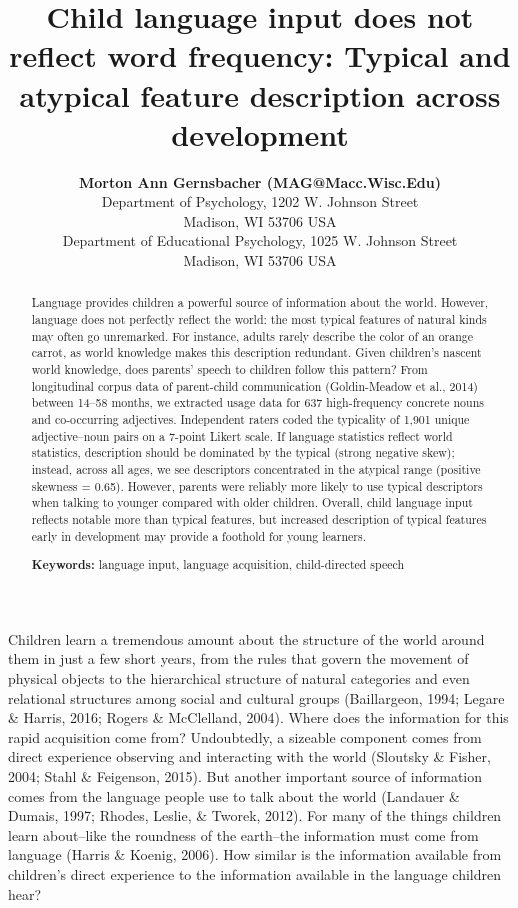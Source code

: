\documentclass[10pt, letterpaper]{article}
\title{Child language input does not reflect word frequency: Typical and
atypical feature description across development}
\author{{\large \bf Morton Ann Gernsbacher (MAG@Macc.Wisc.Edu)} \\ Department of Psychology, 1202 W. Johnson Street \\ Madison, WI 53706 USA \AND {\large \bf Sharon J.~Derry (SDJ@Macc.Wisc.Edu)} \\ Department of Educational Psychology, 1025 W. Johnson Street \\ Madison, WI 53706 USA}
\begin{document}
\maketitle

\begin{abstract}
Language provides children a powerful source of information about the
world. However, language does not perfectly reflect the world: the most
typical features of natural kinds may often go unremarked. For instance,
adults rarely describe the color of an orange carrot, as world knowledge
makes this description redundant. Given children's nascent world
knowledge, does parents' speech to children follow this pattern? From
longitudinal corpus data of parent-child communication (Goldin-Meadow et
al., 2014) between 14--58 months, we extracted usage data for 637
high-frequency concrete nouns and co-occurring adjectives. Independent
raters coded the typicality of 1,901 unique adjective--noun pairs on a
7-point Likert scale. If language statistics reflect world statistics,
description should be dominated by the typical (strong negative skew);
instead, across all ages, we see descriptors concentrated in the
atypical range (positive skewness = 0.65). However, parents were
reliably more likely to use typical descriptors when talking to younger
compared with older children. Overall, child language input reflects
notable more than typical features, but increased description of typical
features early in development may provide a foothold for young learners.

\textbf{Keywords:}
language input, language acquisition, child-directed speech
\end{abstract}

Children learn a tremendous amount about the structure of the world
around them in just a few short years, from the rules that govern the
movement of physical objects to the hierarchical structure of natural
categories and even relational structures among social and cultural
groups (Baillargeon, 1994; Legare \& Harris, 2016; Rogers \& McClelland,
2004). Where does the information for this rapid acquisition come from?
Undoubtedly, a sizeable component comes from direct experience observing
and interacting with the world (Sloutsky \& Fisher, 2004; Stahl \&
Feigenson, 2015). But another important source of information comes from
the language people use to talk about the world (Landauer \& Dumais,
1997; Rhodes, Leslie, \& Tworek, 2012). For many of the things children
learn about--like the roundness of the earth--the information must come
from language (Harris \& Koenig, 2006). How similar is the information
available from children's direct experience to the information available
in the language children hear?
\end{document}
